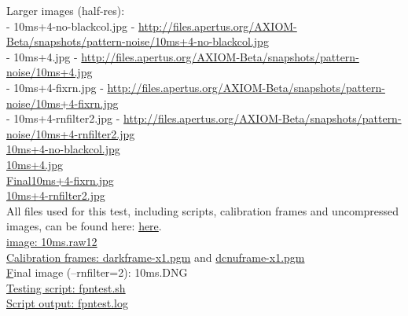Larger images (half-res): \\

- 10ms+4-no-blackcol.jpg - \href{http://files.apertus.org/AXIOM-Beta/snapshots/pattern-noise/10ms+4-no-blackcol.jpg}{http://files.apertus.org/AXIOM-Beta/snapshots/pattern-noise/10ms+4-no-blackcol.jpg}\\
- 10ms+4.jpg - \href{http://files.apertus.org/AXIOM-Beta/snapshots/pattern-noise/10ms+4.jpg}{http://files.apertus.org/AXIOM-Beta/snapshots/pattern-noise/10ms+4.jpg}\\
- 10ms+4-fixrn.jpg - \href{http://files.apertus.org/AXIOM-Beta/snapshots/pattern-noise/10ms+4-fixrn.jpg}{http://files.apertus.org/AXIOM-Beta/snapshots/pattern-noise/10ms+4-fixrn.jpg}\\
- 10ms+4-rnfilter2.jpg - \href{http://files.apertus.org/AXIOM-Beta/snapshots/pattern-noise/10ms+4-rnfilter2.jpg}{http://files.apertus.org/AXIOM-Beta/snapshots/pattern-noise/10ms+4-rnfilter2.jpg} \\

\href{http://files.apertus.org/AXIOM-Beta/snapshots/pattern-noise/10ms+4-no-blackcol.jpg}{10ms+4-no-blackcol.jpg}\\
\href{http://files.apertus.org/AXIOM-Beta/snapshots/pattern-noise/10ms+4.jpg}{10ms+4.jpg}\\
\href{http://files.apertus.org/AXIOM-Beta/snapshots/pattern-noise/10ms+4-fixrn.jpg}{Final10ms+4-fixrn.jpg}\\
\href{http://files.apertus.org/AXIOM-Beta/snapshots/pattern-noise/10ms+4-rnfilter2.jpg}{10ms+4-rnfilter2.jpg}\\

All files used for this test, including scripts, calibration frames and uncompressed images, can be found here: \href{http://files.apertus.org/AXIOM-Beta/snapshots/pattern-noise/}{here}.\\

\href{http://files.apertus.org/AXIOM-Beta/snapshots/pattern-noise/10ms.raw12Raw12}{image: 10ms.raw12}\\
\href{http://files.apertus.org/AXIOM-Beta/snapshots/pattern-noise/darkframe-x1.pgm}{Calibration frames: darkframe-x1.pgm} and \href{http://files.apertus.org/AXIOM-Beta/snapshots/pattern-noise/dcnuframe-x1.pgm}{dcnuframe-x1.pgm}\\
\href{http://files.apertus.org/AXIOM-Beta/snapshots/pattern-noise/10ms.DNG}Final image (--rnfilter=2): {10ms.DNG}\\
\href{http://files.apertus.org/AXIOM-Beta/snapshots/pattern-noise/fpntest.sh}{Testing script: fpntest.sh}\\
\href{http://files.apertus.org/AXIOM-Beta/snapshots/pattern-noise/fpntest.log}{Script output: fpntest.log}\\






